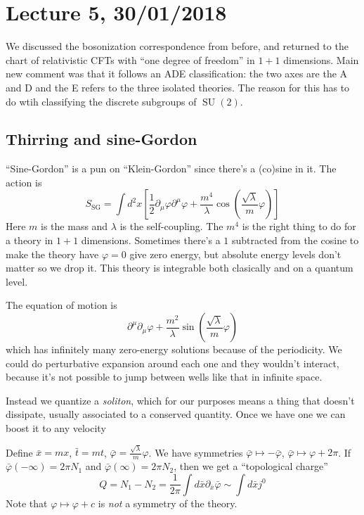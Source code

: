 \section*{Lecture 5, 30/01/2018}
We discussed the bosonization correspondence from before, and returned to the chart of relativistic CFTs with ``one degree of freedom'' in $1+1$ dimensions.
Main new comment was that it follows an ADE classification: the two axes are the A and D and the E refers to the three isolated theories.
The reason for this has to do wtih classifying the discrete subgroups of $\operatorname{SU}(2)$.

\subsection*{Thirring and sine-Gordon}
``Sine-Gordon'' is a pun on ``Klein-Gordon'' since there's a (co)sine in it.
The action is
\[
S_{\text{SG}} = \int d^2x \left [ \frac{1}{2} \partial_\mu \varphi \partial^\mu \varphi + \frac{m^4}{\lambda} \cos\left ( \frac{\sqrt \lambda}{m} \varphi\right ) \right ]
\]
Here $m$ is the mass and $\lambda$ is the self-coupling.
The $m^4$ is the right thing to do for a theory in $1+1$ dimensions.
Sometimes there's a $1$ subtracted from the cosine to make the theory have $\varphi = 0$ give zero energy, but absolute energy levels don't matter so we drop it.
This theory is integrable both clasically and on a quantum level.

The equation of motion is
\[
\partial^\mu \partial_\mu \varphi + \frac{m^2}{\lambda} \sin \left(\frac{\sqrt \lambda }{m} \varphi \right)
\]
which has infinitely many zero-energy solutions because of the periodicity.
We could do perturbative expansion around each one and they wouldn't interact, because it's not possible to jump between wells like that in infinite space.

Instead we quantize a \emph{soliton}, which for our purposes means a thing that doesn't dissipate, usually associated to a conserved quantity.
Once we have one we can boost it to any velocity 

Define $\bar x = mx$, $\bar t = mt$, $\bar \varphi = \frac{\sqrt \lambda}{m} \varphi$.
We have symmetries $\bar \varphi \mapsto - \bar \varphi$, $\bar \varphi \mapsto \varphi + 2\pi$.
If $\bar \varphi (- \infty ) = 2 \pi N_1$ and $\bar \varphi(\infty) = 2 \pi N_2$, then we get a ``topological charge''
\[
Q = N_1 - N_2 = \frac{1}{2 \pi} \int d \bar x \partial_{\bar x} \bar \varphi \sim \int d \bar x j^0
\]
Note that $\varphi \mapsto \varphi + c$ is \emph{not} a symmetry of the theory.

